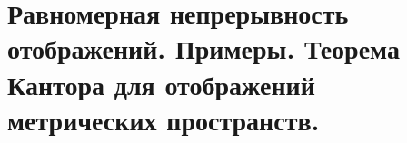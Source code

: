 \section{Равномерная непрерывность отображений. Примеры. Теорема Кантора для отображений метрических пространств.}